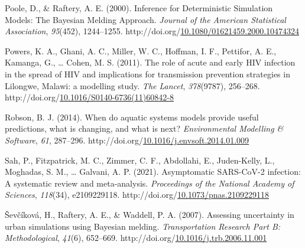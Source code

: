 \documentclass[12pt,twoside]{smiththesis}
\newlength{\cslhangindent}
\newenvironment{CSLReferences}[2] %
 {%
\setlength{\parindent}{0pt}
\ifodd #1 \everypar{\setlength{\hangindent}{\cslhangindent}}\ignorespaces\fi
\ifnum #2 > 0
\setlength{\parskip}{#2\baselineskip}
  \fi
}%
{}
\begin{document}
\begin{CSLReferences}{1}{0}
\leavevmode{}%
Poole, D., \& Raftery, A. E. (2000). Inference for Deterministic Simulation Models: The Bayesian Melding Approach. \emph{Journal of the American Statistical Association}, \emph{95}(452), 1244--1255. http://doi.org/\href{https://doi.org/10.1080/01621459.2000.10474324}{10.1080/01621459.2000.10474324}

\leavevmode{}%
Powers, K. A., Ghani, A. C., Miller, W. C., Hoffman, I. F., Pettifor, A. E., Kamanga, G., \ldots{} Cohen, M. S. (2011). The role of acute and early HIV infection in the spread of HIV and implications for transmission prevention strategies in Lilongwe, Malawi: a modelling study. \emph{The Lancet}, \emph{378}(9787), 256--268. http://doi.org/\href{https://doi.org/10.1016/S0140-6736(11)60842-8}{10.1016/S0140-6736(11)60842-8}

\leavevmode{}%
Robson, B. J. (2014). When do aquatic systems models provide useful predictions, what is changing, and what is next? \emph{Environmental Modelling \& Software}, \emph{61}, 287--296. http://doi.org/\href{https://doi.org/10.1016/j.envsoft.2014.01.009}{10.1016/j.envsoft.2014.01.009}

\leavevmode{}%
Sah, P., Fitzpatrick, M. C., Zimmer, C. F., Abdollahi, E., Juden-Kelly, L., Moghadas, S. M., \ldots{} Galvani, A. P. (2021). Asymptomatic SARS-CoV-2 infection: A systematic review and meta-analysis. \emph{Proceedings of the National Academy of Sciences}, \emph{118}(34), e2109229118. http://doi.org/\href{https://doi.org/10.1073/pnas.2109229118}{10.1073/pnas.2109229118}

\leavevmode{}%
Ševčíková, H., Raftery, A. E., \& Waddell, P. A. (2007). Assessing uncertainty in urban simulations using Bayesian melding. \emph{Transportation Research Part B: Methodological}, \emph{41}(6), 652--669. http://doi.org/\href{https://doi.org/10.1016/j.trb.2006.11.001}{10.1016/j.trb.2006.11.001}

\end{CSLReferences}

\end{document}
